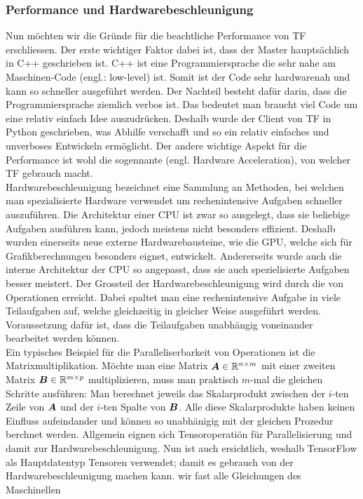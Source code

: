 \subsubsection{Performance und Hardwarebeschleunigung}
Nun möchten wir die Gründe für die beachtliche Performance von TF erschliessen.
Der erste wichtiger Faktor dabei ist, dass der Master hauptsächlich in C++
geschrieben ist. C++ ist eine Programmiersprache die sehr nahe am Maschinen-Code
(engl.: low-level) ist. Somit ist der Code sehr hardwarenah und kann so
schneller ausgeführt werden. Der Nachteil besteht dafür darin, dass die Programmiersprache
ziemlich verbos ist. Das bedeutet man braucht viel Code um eine relativ einfach Idee
auszudrücken. Deshalb wurde der Client von TF in Python geschrieben, was
Abhilfe verschafft und so ein relativ einfaches und unverboses Entwickeln ermöglicht.
\para{}
Der andere wichtige Aspekt für die Performance ist wohl die sogennante
 (engl. Hardware Acceleration), von welcher TF
gebrauch macht. \\
Hardwarebeschleunigung bezeichnet eine Sammlung an Methoden,
bei welchen man spezialisierte Hardware verwendet um rechenintensive Aufgaben
schneller auszuführen. Die Architektur einer CPU ist zwar so ausgelegt, dass
sie beliebige Aufgaben ausführen kann, jedoch meistens nicht besonders
effizient. Deshalb wurden einerseits neue externe Hardwarebausteine, wie die
GPU, welche sich für Grafikberechnungen besonders eignet, entwickelt.
Andererseits wurde auch die interne Architektur der CPU so angepasst, dass sie
auch spezielisierte Aufgaben besser meistert.
\para{}
Der Grossteil der Hardwarebeschleunigung wird durch die
 von Operationen erreicht. Dabei spaltet man eine
rechenintensive Aufgabe in viele Teilaufgaben auf, welche gleichzeitig in
gleicher Weise ausgeführt werden. Voraussetzung dafür ist, dass die
Teilaufgaben unabhängig voneinander bearbeitet werden können. \\
Ein typisches Beispiel für die Paralleliserbarkeit von Operationen ist die
Matrixmultiplikation. Möchte man eine Matrix $\bm{A} \in \mathbb{R}^{n \times m}$ mit
einer zweiten Matrix $\bm{B} \in \mathbb{R}^{m \times p}$ multiplizieren, muss man
praktisch $m$-mal die gleichen Schritte ausführen: Man berechnet jeweils das
Skalarprodukt zwischen der $i$-ten Zeile von $\bm{A}$ und der $i$-ten Spalte
von $\bm{B}$. Alle diese Skalarprodukte haben keinen Einfluss aufeindander und
können so unabhänigig mit der gleichen Prozedur berchnet werden.
\para{}
Allgemein eignen sich Tensoroperatiön für Parallelisierung und damit zur Hardwarebeschleunigung.
Nun ist auch ersichtlich, weshalb TensorFlow als Hauptdatentyp Tensoren
verwendet; damit es gebrauch von der Hardwarebeschleunigung machen kann. wir fast alle Gleichungen des Maschinellen


